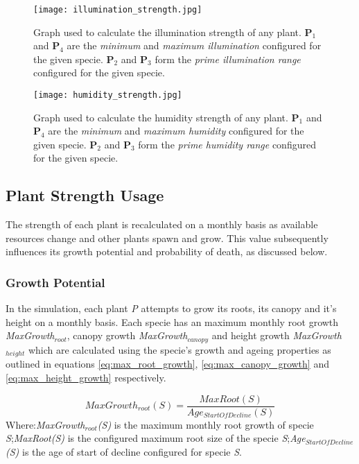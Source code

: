\begin{figure}
\center
	\texttt{[image: illumination\_strength.jpg]}
	\caption{ Graph used to calculate the illumination strength of any plant. \textbf{P$_{1}$} and \textbf{P$_{4}$} are the \textit{minimum} and \textit{maximum illumination} configured for the given specie. \textbf{P$_{2}$} and \textbf{P$_{3}$} form the \textit{prime illumination range} configured for the given specie.  }	
	\label{fig:illumination_strength}
\end{figure}

\begin{figure}
\center
	\texttt{[image: humidity\_strength.jpg]}
	\caption{ Graph used to calculate the humidity strength of any plant. \textbf{P$_{1}$} and \textbf{P$_{4}$} are the \textit{minimum} and \textit{maximum humidity} configured for the given specie. \textbf{P$_{2}$} and \textbf{P$_{3}$} form the \textit{prime humidity range} configured for the given specie.  }	
	\label{fig:humidity_strength}
\end{figure}

\subsection{Plant Strength Usage}

The strength of each plant is recalculated on a monthly basis as available resources change and other plants spawn and grow. This value subsequently influences its growth potential and probability of death, as discussed below.

\subsubsection{Growth Potential}

In the simulation, each plant \textit{P} attempts to grow its roots, its canopy and it's height on a monthly basis. Each specie has an maximum monthly root growth \textit{MaxGrowth$_{root}$}, canopy growth \textit{MaxGrowth$_{canopy}$} and height growth \textit{MaxGrowth$_{height}$} which are calculated using the specie's growth and ageing properties as outlined in equations \ref{eq:max_root_growth}, \ref{eq:max_canopy_growth} and \ref{eq:max_height_growth} respectively.

\begin{equation}
MaxGrowth_{root}(S) = \frac{MaxRoot(S)}{Age_{StartOfDecline}(S)}
\label{eq:max_root_growth}
\end{equation}
Where:\textit{MaxGrowth$_{root}$(S)} is the maximum monthly root growth of specie \textit{S};\textit{MaxRoot(S)} is the configured maximum root size of the specie \textit{S};\textit{Age$_{StartOfDecline}$(S)} is the age of start of decline configured for specie \textit{S}.

